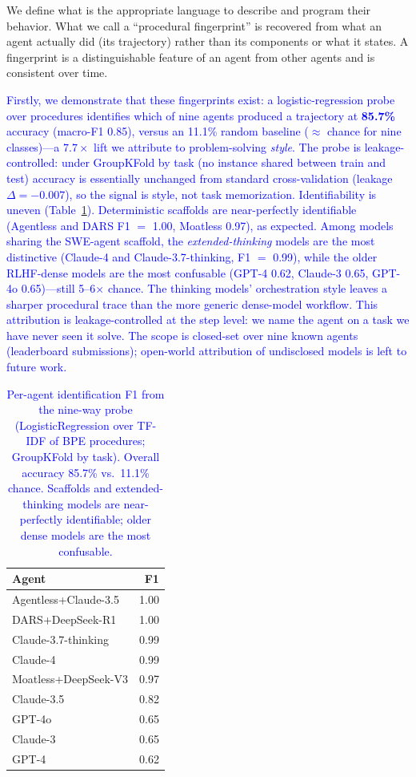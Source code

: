 \documentclass[12pt]{article}
\begin{document}
We define what is the appropriate language to describe and program their behavior. What we call a ``procedural fingerprint'' is recovered from what an agent actually did (its trajectory) rather than its components or what it states. A fingerprint is a distinguishable feature of an agent from other agents and is consistent over time.

\textcolor{blue}{Firstly, we demonstrate that these fingerprints exist: a logistic-regression probe over procedures identifies which of nine agents produced a trajectory at \textbf{85.7\%} accuracy (macro-F1 0.85), versus an 11.1\% random baseline ($\approx$ chance for nine classes)---a $7.7\times$ lift we attribute to problem-solving \emph{style}. The probe is leakage-controlled: under GroupKFold by task (no instance shared between train and test) accuracy is essentially unchanged from standard cross-validation (leakage $\Delta = -0.007$), so the signal is style, not task memorization. Identifiability is uneven (Table~\ref{tab:attribution}). Deterministic scaffolds are near-perfectly identifiable (Agentless and DARS F1 $=$ 1.00, Moatless 0.97), as expected. Among models sharing the SWE-agent scaffold, the \emph{extended-thinking} models are the most distinctive (Claude-4 and Claude-3.7-thinking, F1 $=$ 0.99), while the older RLHF-dense models are the most confusable (GPT-4 0.62, Claude-3 0.65, GPT-4o 0.65)---still 5--6$\times$ chance. The thinking models' orchestration style leaves a sharper procedural trace than the more generic dense-model workflow. This attribution is leakage-controlled at the step level: we name the agent on a task we have never seen it solve. The scope is closed-set over nine known agents (leaderboard submissions); open-world attribution of undisclosed models is left to future work.}

\begin{table}[H]
\centering\small
\begin{tabular}{lr}
\toprule
\textbf{Agent} & \textbf{F1} \\
\midrule
\rowcolor{owbg}     Agentless+Claude-3.5 & 1.00 \\
\rowcolor{owbg}     DARS+DeepSeek-R1     & 1.00 \\
\rowcolor{claudebg} Claude-3.7-thinking  & 0.99 \\
\rowcolor{claudebg} Claude-4             & 0.99 \\
\rowcolor{owbg}     Moatless+DeepSeek-V3 & 0.97 \\
\rowcolor{claudebg} Claude-3.5           & 0.82 \\
\rowcolor{gptbg}    GPT-4o               & 0.65 \\
\rowcolor{claudebg} Claude-3             & 0.65 \\
\rowcolor{gptbg}    GPT-4                & 0.62 \\
\bottomrule
\end{tabular}
\caption{\textcolor{blue}{Per-agent identification F1 from the nine-way probe (LogisticRegression over TF-IDF of BPE procedures; GroupKFold by task). Overall accuracy 85.7\% vs.\ 11.1\% chance. Scaffolds and extended-thinking models are near-perfectly identifiable; older dense models are the most confusable.}}
\label{tab:attribution}
\end{table}
\end{document}
